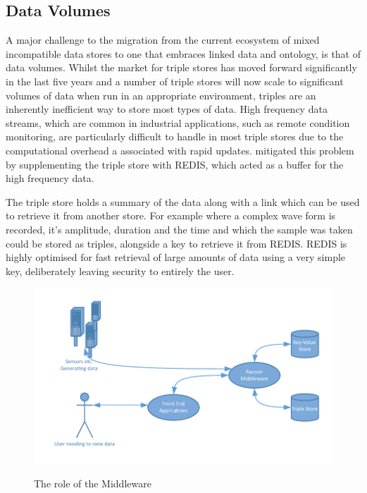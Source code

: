 \subsection{Data Volumes}

A major challenge to the migration from the current ecosystem of mixed incompatible data stores to one that embraces linked data and ontology, is that of data volumes. Whilst the market for triple stores has moved forward significantly in the last five years and a number of triple stores will now scale to significant volumes of data when run in an appropriate environment, triples are an inherently inefficient way to store most types of data. High frequency data streams, which are common in industrial applications, such as remote condition monitoring, are particularly difficult to handle in most triple stores due to the computational overhead a associated with rapid updates. \citet{Tutcher2015} mitigated this problem by supplementing the triple store with REDIS, which acted as a buffer for the high frequency data.

The triple store holds a summary of the data along with a link which can be used to retrieve it from another store. For example where a complex wave form is recorded, it's amplitude, duration and the time and which the sample was taken could be stored as triples, alongside a key to retrieve it from REDIS. REDIS is highly optimised for fast retrieval of large amounts of data using a very simple key, deliberately leaving security to entirely the user.

 \begin{figure}[!h]
\myfloatalign
{\includegraphics[width=\linewidth]{gfx/Middleware_role}} 
\caption{The role of the Middleware}
\label{fig:MiddlewareRole}
\end{figure}


